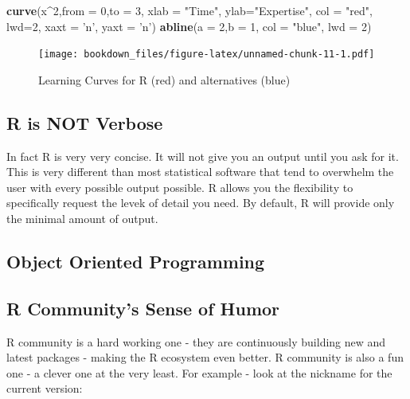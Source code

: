 \documentclass[]{krantz}
\makeatletter
\newenvironment{Shaded}{\begin{snugshade}}{\end{snugshade}}
\newcommand{\KeywordTok}[1]{\textcolor[rgb]{0.27,0.27,0.27}{\textbf{#1}}}
\newcommand{\DataTypeTok}[1]{\textcolor[rgb]{0.27,0.27,0.27}{#1}}
\newcommand{\DecValTok}[1]{\textcolor[rgb]{0.06,0.06,0.06}{#1}}
\newcommand{\StringTok}[1]{\textcolor[rgb]{0.5,0.5,0.5}{#1}}
\newcommand{\OperatorTok}[1]{\textcolor[rgb]{0.43,0.43,0.43}{\textbf{#1}}}
\newcommand{\NormalTok}[1]{#1}
\newenvironment{kframe}{%
\medskip{}
\setlength{\fboxsep}{.8em}
 \def\at@end@of@kframe{}%
 \ifinner\ifhmode%
  \def\at@end@of@kframe{\end{minipage}}%
  \begin{minipage}{\columnwidth}%
 \fi\fi%
 \def\FrameCommand##1{\hskip\@totalleftmargin \hskip-\fboxsep
 \colorbox{shadecolor}{##1}\hskip-\fboxsep
     \hskip-\linewidth \hskip-\@totalleftmargin \hskip\columnwidth}%
 \MakeFramed {\advance\hsize-\width
   \@totalleftmargin\z@ \linewidth\hsize
   \@setminipage}}%
 {\par\unskip\endMakeFramed%
 \at@end@of@kframe}
\renewenvironment{Shaded}{\begin{kframe}}{\end{kframe}}
\makeatother
\begin{document}
\begin{Shaded}
\begin{Highlighting}[]
\KeywordTok{curve}\NormalTok{(x}\OperatorTok{^}\DecValTok{2}\NormalTok{,}\DataTypeTok{from =} \DecValTok{0}\NormalTok{,}\DataTypeTok{to =} \DecValTok{3}\NormalTok{, }\DataTypeTok{xlab =} \StringTok{"Time"}\NormalTok{, }\DataTypeTok{ylab=}\StringTok{"Expertise"}\NormalTok{, }
      \DataTypeTok{col =} \StringTok{"red"}\NormalTok{, }\DataTypeTok{lwd=}\DecValTok{2}\NormalTok{, }\DataTypeTok{xaxt =} \StringTok{'n'}\NormalTok{, }\DataTypeTok{yaxt =} \StringTok{'n'}\NormalTok{)}
\KeywordTok{abline}\NormalTok{(}\DataTypeTok{a =} \DecValTok{2}\NormalTok{,}\DataTypeTok{b =} \DecValTok{1}\NormalTok{, }\DataTypeTok{col =} \StringTok{"blue"}\NormalTok{, }\DataTypeTok{lwd =} \DecValTok{2}\NormalTok{)}
\end{Highlighting}
\end{Shaded}

\begin{figure}
\centering
\texttt{[image: bookdown\_files/figure-latex/unnamed-chunk-11-1.pdf]}
\caption{\label{fig:unnamed-chunk-11}Learning Curves for R (red) and
alternatives (blue)}
\end{figure}

\subsection{R is NOT Verbose}\label{r-is-not-verbose}

In fact R is very very concise. It will not give you an output until you
ask for it. This is very different than most statistical software that
tend to overwhelm the user with every possible output possible. R allows
you the flexibility to specifically request the levek of detail you
need. By default, R will provide only the minimal amount of output.

\subsection{Object Oriented
Programming}\label{object-oriented-programming}

\subsection{R Community's Sense of
Humor}\label{r-communitys-sense-of-humor}

R community is a hard working one - they are continuously building new
and latest packages - making the R ecosystem even better. R community is
also a fun one - a clever one at the very least. For example - look at
the nickname for the current version:
\end{document}
